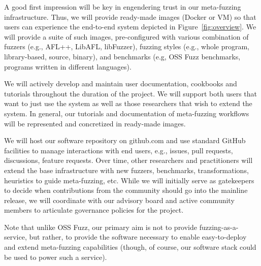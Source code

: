 

A good first impression will be key in engendering trust in our meta-fuzzing infrastructure.
Thus, we will provide ready-made images (Docker or VM) so that users can experience
the end-to-end system depicted in Figure~\ref{fig:overview}.
We will provide a suite of such images, pre-configured with various combination of
fuzzers (e.g., AFL++, LibAFL, libFuzzer), 
fuzzing styles (e.g., whole program, library-based, source, binary), 
and benchmarks (e.g, OSS Fuzz benchmarks, programs written in different languages).

We will actively develop and maintain user documentation, cookbooks and tutorials throughout
the duration of the project. We will support both users that want to just use the system
as well as those researchers that wish to extend the system.
In general, our tutorials and documentation of meta-fuzzing workflows will be
represented and concretized in ready-made images. 

We will host our software repository on github.com and use standard GitHub facilities
to manage interactions with end users, e.g., issues, pull requests, discussions, feature requests.
Over time, other researchers and practitioners will extend the base infrastructure with
new fuzzers, benchmarks, transformations, heuristics to guide meta-fuzzing, etc. 
While we will initially serve as gatekeepers to decide when contributions from the community
should go into the mainline release, we will coordinate with our advisory board and active community 
members to articulate governance policies for the project.

Note that unlike OSS Fuzz, our primary aim is not to provide fuzzing-as-a-service, but
rather, to provide the software necessary to enable easy-to-deploy and extend meta-fuzzing 
capabilities (though, of course, our software stack could be used to power such a service).

